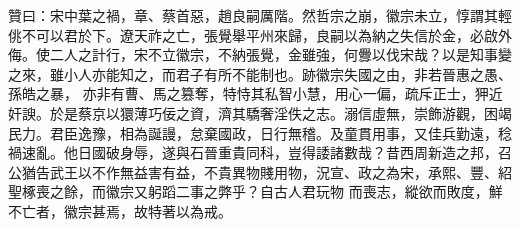 \begin{pinyinscope}
 贊曰：宋中葉之禍，章、蔡首惡，趙良嗣厲階。然哲宗之崩，徽宗未立，惇謂其輕佻不可以君於下。遼天祚之亡，張覺舉平州來歸，良嗣以為納之失信於金，必啟外侮。使二人之計行，宋不立徽宗，不納張覺，金雖強，何釁以伐宋哉？以是知事變之來，雖小人亦能知之，而君子有所不能制也。跡徽宗失國之由，非若晉惠之愚、孫皓之暴，
 亦非有曹、馬之篡奪，特恃其私智小慧，用心一偏，疏斥正士，狎近奸諛。於是蔡京以獧薄巧佞之資，濟其驕奢淫佚之志。溺信虛無，崇飾游觀，困竭民力。君臣逸豫，相為誕謾，怠棄國政，日行無稽。及童貫用事，又佳兵勤遠，稔禍速亂。他日國破身辱，遂與石晉重貴同科，豈得諉諸數哉？昔西周新造之邦，召公猶告武王以不作無益害有益，不貴異物賤用物，況宣、政之為宋，承熙、豐、紹聖椓喪之餘，而徽宗又躬蹈二事之弊乎？自古人君玩物
 而喪志，縱欲而敗度，鮮不亡者，徽宗甚焉，故特著以為戒。



\end{pinyinscope}